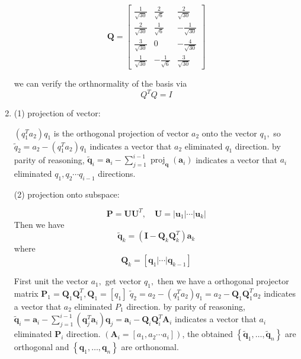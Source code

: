 \documentclass[english,onecolumn]{IEEEtran}
\begin{document}
\begin{enumerate}
$$
\mathbf{Q}=\left[\begin{array}{ccc}
	\frac{1}{\sqrt{30}} & \frac{2}{\sqrt{6}} & \frac{2}{\sqrt{30}} \\
	\frac{2}{\sqrt{30}} & \frac{1}{\sqrt{6}} & -\frac{1}{\sqrt{30}} \\
	\frac{3}{\sqrt{30}} & 0 & -\frac{4}{\sqrt{30}} \\
	\frac{1}{\sqrt{30}} & -\frac{1}{\sqrt{6}} & \frac{3}{\sqrt{30}}
\end{array}\right]
$$

we can verify the orthnormality of the basis via
$$
Q^{T} Q=I
$$
	\item 
	
	(1) projection of vector:
	
	$\left(q_{1}^{T} a_{2}\right) q_{1}$ is the orthogonal projection of vector $a_{2}$ onto the vector $q_{1},$ so $\tilde{q}_{2}=a_{2}-\left(q_{1}^{T} a_{2}\right) q_{1}$ indicates a vector that $a_{2}$ eliminated $q_{1}$ direction. by parity of reasoning, 	$\tilde{\mathbf{q}}_{i}=\mathbf{a}_{i}-\sum_{j=1}^{i-1} \operatorname{proj}_{\mathbf{q}}\left(\mathbf{a}_{i}\right)$ indicates a
	vector that $a_{i}$ eliminated $q_{1}, q_{2} \cdots q_{i-1}$ directions.

	(2) projection onto subspace:
	
	$$
	\mathbf{P}=\mathbf{U U}^{T}, \quad \mathbf{U}=\left|\mathbf{u}_{1}\right| \cdots\left|\mathbf{u}_{k}\right|
	$$
	Then we have
	$$
	\tilde{\mathbf{q}}_{k}=\left(\mathbf{I}-\mathbf{Q}_{k} \mathbf{Q}_{k}^{T}\right) \mathbf{a}_{k}
	$$
	where
	$$
	\mathbf{Q}_{k}=\left[\mathbf{q}_{1}|\cdots| \mathbf{q}_{k-1}\right]
	$$
	
	First unit the vector $a_{1},$ get vector $q_{1},$ then we have a orthogonal projector matrix $\mathbf{P}_{1}=\mathbf{Q}_{1} \mathbf{Q}_{1}^{T}, \mathbf{Q}_{1}=\left[q_{1}\right]$
	$\tilde{q}_{2}=a_{2}-\left(q_{1}^{T} a_{2}\right) q_{1}=a_{2}-\mathbf{Q}_{1} \mathbf{Q}_{1}^{T} a_{2}$ indicates a vector that $a_{2}$ eliminated $P_{1}$ direction. by parity of reasoning, $\tilde{\mathbf{q}}_{i}=\mathbf{a}_{i}-\sum_{j=1}^{i-1}\left(\mathbf{q}_{j}^{T} \mathbf{a}_{i}\right) \mathbf{q}_{j}=\mathbf{a}_{i}-\mathbf{Q}_{i} \mathbf{Q}_{i}^{T} \mathbf{A}_{i}$ indicates a vector that $a_{i}$ eliminated $\mathbf{P}_{i}$
	direction. $\left(\mathbf{A}_{i}=\left[a_{1}, a_{2} \cdots a_{i}\right]\right)$, the obtained $\left\{\tilde{\mathbf{q}}_{1}, \ldots, \tilde{\mathbf{q}}_{n}\right\}$ are orthogonal and $\left\{\mathbf{q}_{1}, \ldots, \mathbf{q}_{n}\right\}$ are orthonomal.
	


\end{enumerate}
\end{document}
